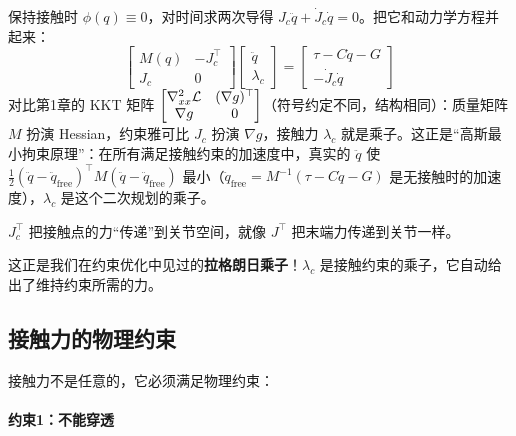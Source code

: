 \begin{keyformula}[title=接触动力学的 KKT 形式]
保持接触时 $\phi(q) \equiv 0$，对时间求两次导得 $J_c \ddot{q} + \dot{J}_c \dot{q} = 0$。把它和动力学方程并起来：
\begin{equation}
\begin{bmatrix} M(q) & -J_c^\top \\ J_c & 0 \end{bmatrix}
\begin{bmatrix} \ddot{q} \\ \lambda_c \end{bmatrix}
=
\begin{bmatrix} \tau - C\dot{q} - G \\ -\dot{J}_c \dot{q} \end{bmatrix}
\end{equation}
对比第1章的 KKT 矩阵 $\begin{bmatrix} \nabla^2_{xx}\mathcal{L} & (\nabla g)^\top \\ \nabla g & 0 \end{bmatrix}$（符号约定不同，结构相同）：质量矩阵 $M$ 扮演 Hessian，约束雅可比 $J_c$ 扮演 $\nabla g$，接触力 $\lambda_c$ 就是乘子。这正是“高斯最小拘束原理”：在所有满足接触约束的加速度中，真实的 $\ddot{q}$ 使 $\tfrac{1}{2}(\ddot{q} - \ddot{q}_{\text{free}})^\top M (\ddot{q} - \ddot{q}_{\text{free}})$ 最小（$\ddot{q}_{\text{free}} = M^{-1}(\tau - C\dot{q} - G)$ 是无接触时的加速度），$\lambda_c$ 是这个二次规划的乘子。
\end{keyformula}

\begin{physicalmeaning}
$J_c^\top$ 把接触点的力“传递”到关节空间，就像 $J^\top$ 把末端力传递到关节一样。

这正是我们在约束优化中见过的\textbf{拉格朗日乘子}！$\lambda_c$ 是接触约束的乘子，它自动给出了维持约束所需的力。
\end{physicalmeaning}

\subsection{接触力的物理约束}

接触力不是任意的，它必须满足物理约束：

\paragraph{约束1：不能穿透}

